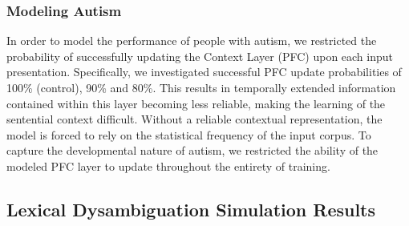 \subsubsection{Modeling Autism}

In order to model the performance of people with autism, we restricted the probability of successfully updating the Context Layer (PFC) upon each input presentation.  Specifically, we investigated successful PFC update probabilities of 100\% (control), 90\% and 80\%.  This results in temporally extended information contained within this layer becoming less reliable, making the learning of the sentential context difficult.  Without a reliable contextual representation, the model is forced to rely on the statistical frequency of the input corpus. To capture the developmental nature of autism, we restricted the ability of the modeled PFC layer to update throughout the entirety of training.

\subsection{Lexical Dysambiguation Simulation Results}

